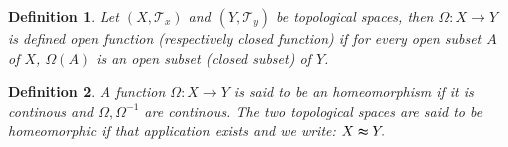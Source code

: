 \documentclass{article}
\newtheorem{definition}{Definition}
\begin{document}
    \begin{definition}
        Let $(X, \mathcal{T}_x)$ and $(Y, \mathcal{T}_y)$ be topological spaces, then $ \varOmega :X \rightarrow Y$ is defined open function (respectively closed function) if for every open subset $A$ of $X$, $\varOmega(A)$ is an open subset (closed subset) of $Y$.  
    \end{definition}
    \begin{definition}
        A function $\varOmega: X \rightarrow Y$ is said to be an homeomorphism if it is continous and $\varOmega,\varOmega^{-1}$ are continous. The two topological spaces are said to be homeomorphic if that application exists and we write: $X \thickapprox Y.$
    \end{definition}    
\end{document}
